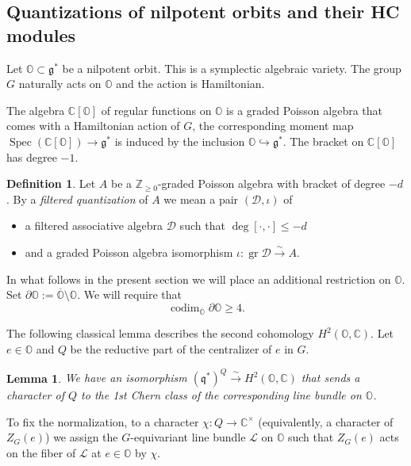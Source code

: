 \documentclass[12pt]{amsart}
\newcommand{\C}{\mathbb{C}}
\newcommand{\g}{\mathfrak{g}}
\newcommand{\Orb}{\mathbb{O}}
\newcommand{\Z}{\mathbb{Z}}
\newcommand{\gr}{\operatorname{gr}}
\newcommand{\q}{\mathfrak{q}}
\newcommand{\Dcal}{\mathcal{D}}
\newtheorem{Lem}[Thm]{Lemma}
\theoremstyle{definition}
\newtheorem{defi}[Thm]{Definition}
\numberwithin{equation}{section}
\begin{document}
\subsection{Quantizations of nilpotent orbits and their HC modules}\label{SS_quant_nilp}
Let $\Orb\subset \g^*$ be a nilpotent orbit. This is a symplectic algebraic variety.
The group $G$ naturally acts on $\Orb$ and the action is Hamiltonian.

The algebra
$\C[\Orb]$ of regular functions on $\Orb$ is a graded Poisson algebra
that comes with a Hamiltonian action of $G$, the corresponding moment
map $\operatorname{Spec}(\C[\Orb])\rightarrow \g^*$ is induced by the inclusion
$\Orb\hookrightarrow \g^*$. The bracket on
$\C[\Orb]$ has degree $-1$.

\begin{defi}\label{defi:quantization}
Let $A$ be a $\Z_{\geqslant 0}$-graded Poisson algebra with bracket of degree $-d$.
By a {\it filtered quantization} of $A$ we mean a pair $(\Dcal,\iota)$ of
\begin{itemize}
\item
a filtered
associative algebra $\Dcal$ such that $\deg [\cdot,\cdot]\leqslant -d$
\item and a graded Poisson algebra isomorphism $\iota:\gr \Dcal\xrightarrow{\sim} A$.
\end{itemize}
\end{defi}

In what follows in the present section we will place an additional restriction on
$\Orb$. Set $\partial \Orb:=\overline{\Orb}\setminus \Orb$.
We will require that
\begin{equation}\label{eq:codim_condition}
\operatorname{codim}_{\overline{\Orb}}\partial\Orb\geqslant 4.
\end{equation}

The following classical lemma describes the second cohomology $H^2(\Orb,\C)$. Let $e\in \Orb$
and $Q$ be the reductive part of the centralizer of $e$ in $G$.

\begin{Lem}\label{Lem:G_orbit_cohomology}
We have an isomorphism $(\q^*)^Q\xrightarrow{\sim} H^2(\Orb,\C)$ that sends a character of $Q$
to the 1st Chern class of the corresponding line bundle on $\Orb$.
\end{Lem}

To fix the normalization, to a character $\chi:Q\rightarrow \C^\times$ (equivalently,
a character of $Z_G(e)$) we assign the $G$-equivariant line bundle $\mathcal{L}$ on $\Orb$
such that $Z_G(e)$ acts on the fiber of $\mathcal{L}$ at $e\in \Orb$ by $\chi$.
\end{document}
